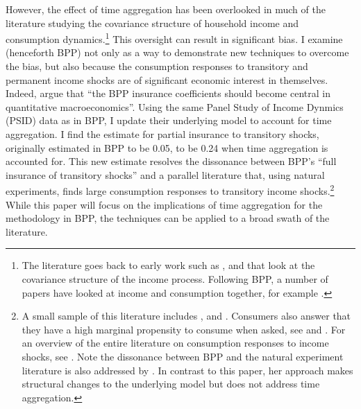 \documentclass[AER]{AEA}
\begin{document}
However, the effect of time aggregation has been overlooked in much of the  literature studying the covariance structure of household income and consumption dynamics.\footnote{The literature goes back to early work such as \cite{hause_1973}, \cite{weiss_1979} and  \cite{macurdy_time_1982} that look at the covariance structure of the income process. Following BPP, a number of papers have looked at income and consumption together, for example \cite{arellano_earnings_2017} .} This oversight can result in significant bias. I examine \cite{blundell_consumption_2008} (henceforth BPP) not only as a way to demonstrate new techniques to overcome the bias, but also because the consumption responses to transitory and permanent income shocks are of significant economic interest in themselves. Indeed, \cite{kaplan_how_2010} argue that ``the BPP insurance coefficients should become central in quantitative macroeconomics''. Using the same Panel Study of Income Dynmics (PSID) data as in BPP, I update their underlying model to account for time aggregation. I find the estimate for partial insurance to transitory shocks, originally estimated in BPP to be 0.05, to be 0.24 when time aggregation is accounted for. This new estimate resolves the dissonance between BPP's ``full insurance of transitory shocks'' and  a parallel literature that, using natural experiments, finds large consumption responses to transitory income shocks.\footnote{A small sample of this literature includes \cite{parker_consumer_2013}, \cite{agarwal_consumption_2014} and \cite{Sahmetal:2008TaxRebates}. Consumers also answer that they have a high marginal propensity to consume when asked, see \cite{fuster_what_2018} and \cite{jappelli_fiscal_2014}. For an overview of the entire literature on consumption responses to income shocks, see \cite{jappelli_consumption_2010}. Note the dissonance between BPP and the natural experiment literature is also addressed by \cite{commault_how_2017}. In contrast to this paper, her approach makes structural changes to the underlying model but does not address time aggregation.} While this paper will focus on the implications of time aggregation for the methodology in BPP, the techniques can be applied to a broad swath of the literature.
\end{document}
